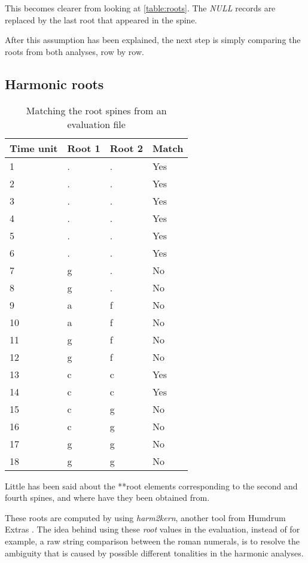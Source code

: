 		This becomes clearer from looking at \autoref{table:roots}. The \emph{NULL} records are replaced by the last root that appeared in the spine.

		After this assumption has been explained, the next step is simply comparing the roots from both analyses, row by row.

	\subsection{Harmonic roots}
		\begin{table}[tbp]
		\centering
		\begin{tabular}{|l|l|l|l|}
		\hline
		Time unit & Root 1 & Root 2 & Match \\ \hline
		1 & . & . & Yes \\ \hline
		2 & . & . & Yes \\ \hline
		3 & . & . & Yes \\ \hline
		4 & . & . & Yes \\ \hline
		5 & . & . & Yes \\ \hline
		6 & . & . & Yes \\ \hline
		7 & g & . & No \\ \hline
		8 & g & . & No \\ \hline
		9 & a & f & No \\ \hline
		10 & a & f & No \\ \hline
		11 & g & f & No \\ \hline
		12 & g & f & No \\ \hline
		13 & c & c & Yes \\ \hline
		14 & c & c & Yes \\ \hline
		15 & c & g & No \\ \hline
		16 & c & g & No \\ \hline
		17 & g & g & No \\ \hline
		18 & g & g & No \\ \hline
		\end{tabular}
		\caption{Matching the root spines from an evaluation file}
		\label{table:matches}
		\end{table}

		Little has been said about the **root elements corresponding to the second and fourth spines, and where have they been obtained from.

		These roots are computed by using \emph{harm2kern}, another tool from Humdrum Extras \cite{humextra}. The idea behind using these \emph{root} values in the evaluation, instead of for example, a raw string comparison between the roman numerals, is to resolve the ambiguity that is caused by possible different tonalities in the harmonic analyses.

